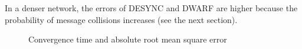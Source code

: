 In a denser network, the errors of DESYNC and DWARF are higher because the probability of message collisions increases (see the next section). 


\begin{figure}[!t]
\centerline{
	\hfil
	\hfil
}
\caption{Convergence time and absolute root mean square error}
\label{fig:rmse-convergence}
\lofcont
\end{figure}

